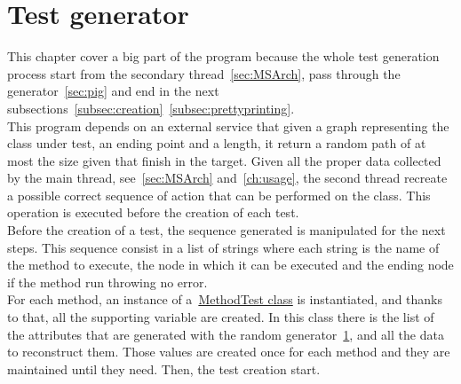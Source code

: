 \section{Test generator}\label{sec:tg}
This chapter cover a big part of the program because the whole test generation process start from the secondary thread~\ref{sec:MSArch}, pass through the generator~\ref{sec:pig} and end in the next subsections~\ref{subsec:creation}~\ref{subsec:prettyprinting}.\\
This program depends on an external service that given a graph representing the class under test, an ending point and a length, it return a random path of at most the size given that finish in the target.
Given all the proper data collected by the main thread, see~\ref{sec:MSArch} and~\ref{ch:usage}, the second thread recreate a possible correct sequence of action that can be performed on the class.
This operation is executed before the creation of each test.\\
Before the creation of a test, the sequence generated is manipulated for the next steps.
This sequence consist in a list of strings where each string is the name of the method to execute, the node in which it can be executed and the ending node if the method run throwing no error.\\
For each method, an instance of a~\href{\projRootLink/support/test/MethodTest.java}{MethodTest class} is instantiated, and thanks to that, all the supporting variable are created.
In this class there is the list of the attributes that are generated with the random generator~\ref{sec:tg}, and all the data to reconstruct them.
Those values are created once for each method and they are maintained until they need.
Then, the test creation start.
